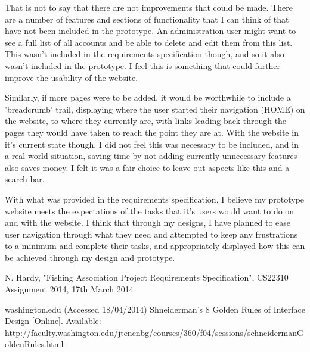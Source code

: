\documentclass{article}
\begin{document}
That is not to say that there are not improvements that could be made. There are a number of features and sections of functionality that I can think of that have not been included in the prototype. An administration user might want to see a full list of all accounts and be able to delete and edit them from this list. This wasn't included in the requirements specification though, and so it also wasn't included in the prototype. I feel this is something that could further improve the usability of the website.

Similarly, if more pages were to be added, it would be worthwhile to include a 'breadcrumb' trail, displaying where the user started their navigation (HOME) on the website, to where they currently are, with links leading back through the pages they would have taken to reach the point they are at. With the website in it's current state though, I did not feel this was necessary to be included, and in a real world situation, saving time by not adding currently unnecessary features also saves money. I felt it was a fair choice to leave out aspects like this and a search bar.

With what was provided in the requirements specification, I believe my prototype website meets the expectations of the tasks that it's users would want to do on and with the website. I think that through my designs, I have planned to ease user navigation through what they need and attempted to keep any frustrations to a minimum and complete their tasks, and appropriately displayed how this can be achieved through my design and prototype.

\clearpage


\begin{thebibliography}{1}

 N. Hardy, "Fishing Association Project Requirements Specification", CS22310 Assignment 2014, 17th March 2014

 washington.edu (Accessed 18/04/2014) Shneiderman's 8 Golden Rules of Interface Design [Online]. Available: http://faculty.washington.edu/jtenenbg/courses/360/f04/sessions/schneidermanGoldenRules.html


\end{thebibliography}
\end{document}
